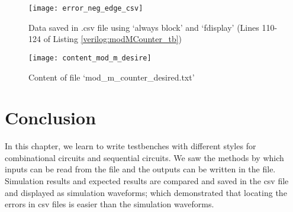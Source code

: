 \begin{explanation}
	\begin{figure}[!h]
		\centering
		\texttt{[image: error\_neg\_edge\_csv]}
		\caption{Data saved in .csv file using `always block' and `fdisplay' (Lines 110-124 of Listing \ref{verilog:modMCounter_tb})}
		\label{fig:error_neg_edge_csv}
	\end{figure}
	
	\begin{figure}[!h]
		\centering
		\texttt{[image: content\_mod\_m\_desire]}
		\caption{Content of file `mod\_m\_counter\_desired.txt' }
		\label{fig:content_mod_m_desire}
	\end{figure}
	
\end{explanation}




\section{Conclusion}
In this chapter, we learn to write testbenches with different styles for combinational circuits and sequential circuits. We saw the methods by which inputs can be read from the file and the outputs can be written in the file. Simulation results and expected results are compared and saved in the csv file and displayed as simulation waveforms; which demonstrated that locating the errors in csv files is easier than the simulation waveforms.